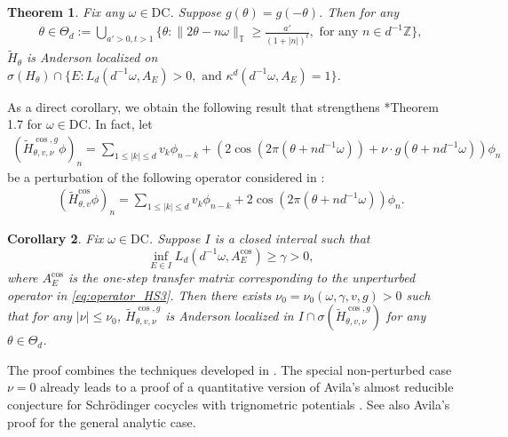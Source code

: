 \documentclass[11pt]{amsart}
\newtheorem{theorem}{Theorem}[section]
\newtheorem{corollary}[theorem]{Corollary}
\newcommand{\Z}{\mathbb Z}
\newcommand{\T}{\mathbb T}
\begin{document}
\begin{theorem}\label{thm:acceleration=1}
Fix any $\omega\in \mathrm{DC}$.
Suppose $g(\theta)=g(-\theta)$.
Then for any 
\begin{align}\label{def:Theta_d}
\theta\in \Theta_d:=\bigcup_{a'>0, t>1} \Big\{\theta: \|2\theta-n\omega\|_{\T}\geq \frac{a'}{(1+|n|)^{t}}, \text{\ for any\ \  } n\in d^{-1}\Z\Big\},
\end{align}
$\tilde{H}_{\theta}$ is Anderson localized on $\sigma(H_{\theta})\cap \{E: L_d(d^{-1}\omega,A_E)>0, \text{\  and\  } \kappa^d(d^{-1}\omega,A_E)=1\}$.
\end{theorem}

As a direct corollary, we obtain the following result that strengthens \cite{HS3}*{Theorem 1.7} for $\omega\in \mathrm{DC}$.
In fact, let 
\begin{align}
    (\tilde{H}_{\theta,v,\nu}^{\cos,g}\phi)_n=\sum_{1\leq |k|\leq d}v_k \phi_{n-k}+(2 \cos(2\pi (\theta+nd^{-1}\omega))+\nu \cdot g(\theta+nd^{-1}\omega))\phi_n
\end{align}
be a perturbation of the following operator considered in \cite{HS3}:
\begin{align}\label{eq:operator_HS3}
    (\tilde{H}^{\cos}_{\theta,v}\phi)_n=\sum_{1\leq |k|\leq d}v_k\phi_{n-k}+2 \cos(2\pi (\theta+nd^{-1}\omega))\phi_n.
\end{align} 

\begin{corollary}
Fix $\omega\in \mathrm{DC}$. Suppose $I$ is a closed interval such that \[\inf_{E\in I} L_d(d^{-1}\omega, A^{\cos}_E)\geq \gamma>0,\] where $A^{\cos}_E$ is the one-step transfer matrix corresponding to the unperturbed operator in \eqref{eq:operator_HS3}.
Then there exists $\nu_0=\nu_0(\omega,\gamma,v,g)>0$ such that for any $|\nu|\leq \nu_0$, $\tilde{H}^{\cos,g}_{\theta,v,\nu}$ is Anderson localized in $I\cap \sigma(\tilde{H}^{\cos,g}_{\theta,v,\nu})$ for any $\theta\in \Theta_d$.
\end{corollary}
The proof combines the techniques developed in \cite{HS2,HS3}.
The special non-perturbed case $\nu=0$ already leads to a proof of a quantitative version of Avila's almost reducible conjecture for Schr\"odinger cocycles with trignometric potentials \cite{HS3}. See also Avila's proof \cite{Av2} for the general analytic case.
\end{document}
